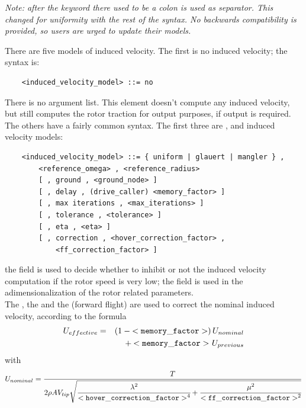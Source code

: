 \emph{Note: after the keyword  there used to be
a colon is used as separator.
This changed for uniformity with the rest of the syntax.
No backwards compatibility is provided, so users are urged to update
their models.
}

\noindent
There are five models of induced velocity. 
The first is no induced velocity; the syntax is:
\begin{verbatim}
    <induced_velocity_model> ::= no
\end{verbatim}
There is no argument list. This element doesn't compute any induced
velocity, but still computes the rotor traction for output purposes,
if output is required.
The others have a fairly common syntax.  The first three are
,  and  induced velocity
models:
\begin{verbatim}
    <induced_velocity_model> ::= { uniform | glauert | mangler } , 
        <reference_omega> , <reference_radius> 
        [ , ground , <ground_node> ]
        [ , delay , (drive_caller) <memory_factor> ]
        [ , max iterations , <max_iterations> ]
        [ , tolerance , <tolerance> ]
        [ , eta , <eta> ]
        [ , correction , <hover_correction_factor> ,
            <ff_correction_factor> ]
\end{verbatim}
the  field is used to decide whether to inhibit
or not the induced velocity computation if the rotor speed is very low;
the  field is used in the adimensionalization
of the rotor related parameters. \\
The , the  
and the  (forward flight) are
used to correct the nominal induced velocity, according to the formula
\begin{eqnarray*}
	U_{effective} & = &
	\left( 1 - \mathtt{<memory\_factor>} \right) 
		U_{nominal} \\
	& & \mbox{} + \mathtt{<memory\_factor>} \ U_{previous}
\end{eqnarray*}
with
\begin{displaymath}
	U_{nominal} = \frac{T}{2 \rho A V_{tip} \sqrt{
		\cfrac{\lambda^2}{\mathtt{<hover\_correction\_factor>}^4}
		+ \cfrac{\mu^2}{\mathtt{<ff\_correction\_factor>}^2}
	}}
\end{displaymath}

